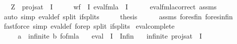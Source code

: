 \begin{isabellebody}
\ \ \ {\isachardoublequoteopen}Z\ {\isacharequal}{\kern0pt}\ proj{\isacharunderscore}{\kern0pt}sat\ {\isasymphi}\ I{\isachardoublequoteclose}\isanewline
%
\isadelimproof
%
\endisadelimproof
%
\isatagproof
{}\isamarkupfalse%
\ {\isacharminus}{\kern0pt}\isanewline
\ \ \isamarkupfalse%
\ {\isachardoublequoteopen}wf\ {\isasymphi}\ I\ {\isacharparenleft}{\kern0pt}eval{\isacharunderscore}{\kern0pt}fmla\ {\isasymphi}\ I{\isacharparenright}{\kern0pt}{\isachardoublequoteclose}\isanewline
\ \ \ \ \isamarkupfalse%
\ eval{\isacharunderscore}{\kern0pt}fmla{\isacharunderscore}{\kern0pt}correct\ assms\isanewline
\ \ \ \ \isamarkupfalse%
\ {\isacharparenleft}{\kern0pt}auto\ simp{\isacharcolon}{\kern0pt}\ eval{\isacharunderscore}{\kern0pt}def\ split{\isacharcolon}{\kern0pt}\ if{\isacharunderscore}{\kern0pt}splits{\isacharparenright}{\kern0pt}\isanewline
\ \ \isamarkupfalse%
\ \isamarkupfalse%
\ {\isacharquery}{\kern0pt}thesis\isanewline
\ \ \ \ \isamarkupfalse%
\ assms\ fo{\isacharunderscore}{\kern0pt}res{\isacharunderscore}{\kern0pt}fin\ fo{\isacharunderscore}{\kern0pt}res{\isacharunderscore}{\kern0pt}infin\isanewline
\ \ \ \ \isamarkupfalse%
\ {\isacharparenleft}{\kern0pt}fastforce\ simp{\isacharcolon}{\kern0pt}\ eval{\isacharunderscore}{\kern0pt}def\ fo{\isacharunderscore}{\kern0pt}rep\ split{\isacharcolon}{\kern0pt}\ if{\isacharunderscore}{\kern0pt}splits{\isacharparenright}{\kern0pt}\isanewline
{}\isamarkupfalse%
%
\endisatagproof
{\isafoldproof}%
%
\isadelimproof
\isanewline
%
\endisadelimproof
\isanewline
{}\isamarkupfalse%
\ eval{\isacharunderscore}{\kern0pt}complete{\isacharcolon}{\kern0pt}\isanewline
\ \ \ {\isasymphi}\ {\isacharcolon}{\kern0pt}{\isacharcolon}{\kern0pt}\ {\isachardoublequoteopen}{\isacharparenleft}{\kern0pt}{\isacharprime}{\kern0pt}a\ {\isacharcolon}{\kern0pt}{\isacharcolon}{\kern0pt}\ infinite{\isacharcomma}{\kern0pt}\ {\isacharprime}{\kern0pt}b{\isacharparenright}{\kern0pt}\ fo{\isacharunderscore}{\kern0pt}fmla{\isachardoublequoteclose}\isanewline
\ \ \ {\isachardoublequoteopen}eval\ {\isasymphi}\ I\ {\isacharequal}{\kern0pt}\ Infin{\isachardoublequoteclose}\isanewline
\ \ \ {\isachardoublequoteopen}infinite\ {\isacharparenleft}{\kern0pt}proj{\isacharunderscore}{\kern0pt}sat\ {\isasymphi}\ I{\isacharparenright}{\kern0pt}{\isachardoublequoteclose}\isanewline
%
\isadelimproof
%
\endisadelimproof
%
\isatagproof
{}\isamarkupfalse%

\end{isabellebody}
